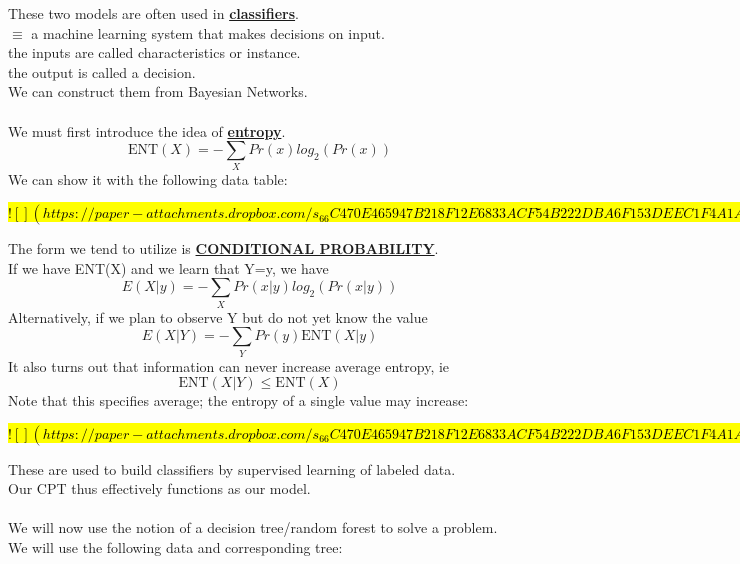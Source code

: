 \documentclass[../../lecture_notes.tex]{subfiles}
\begin{document}
\noindent These two models are often used in \textbf{\underline{classifiers}}.\\
\indent $\equiv$ a machine learning system that makes decisions on input.\\
	\indent \indent the inputs are called characteristics or instance.\\
	\indent \indent the output is called a decision.\\
We can construct them from Bayesian Networks.\\
\\
We must first introduce the idea of \textbf{\underline{entropy}}.
	\begin{equation*} \text{ENT}(X) = -\sum_X Pr(x) log_2{(Pr(x))} \end{equation*}
We can show it with the following data table:

\hl{
$![](https://paper-attachments.dropbox.com/s_66C470E465947B218F12E6833ACF54B222DBA6F153DEEC1F4A1A4D06909A7A0F_1590913272078_Untitled+drawing+10.jpg)$
}

\noindent The form we tend to utilize is \textbf{\underline{CONDITIONAL PROBABILITY}}.\\
If we have ENT(X) and we learn that Y=y, we have 
	\begin{equation*} E(X|y) = - \sum_X Pr(x|y) log_2{(Pr(x|y))} \end{equation*}
Alternatively, if we plan to observe Y but do not yet know the value
	\begin{equation*} E(X|Y) = - \sum_Y Pr(y) \text{ENT}(X|y) \end{equation*}
It also turns out that information can never increase average entropy, ie
	\begin{equation*} \text{ENT}(X|Y) \leq \text{ENT}(X) \end{equation*}
Note that this specifies average; the entropy of a single value may increase:

\hl{
$![](https://paper-attachments.dropbox.com/s_66C470E465947B218F12E6833ACF54B222DBA6F153DEEC1F4A1A4D06909A7A0F_1590913804777_Untitled+drawing+11.jpg)$
}

\noindent These are used to build classifiers by supervised learning of labeled data.\\
Our CPT thus effectively functions as our model.\\
\\
We will now use the notion of a decision tree/random forest to solve a problem.\\
We will use the following data and corresponding tree:
\end{document}
